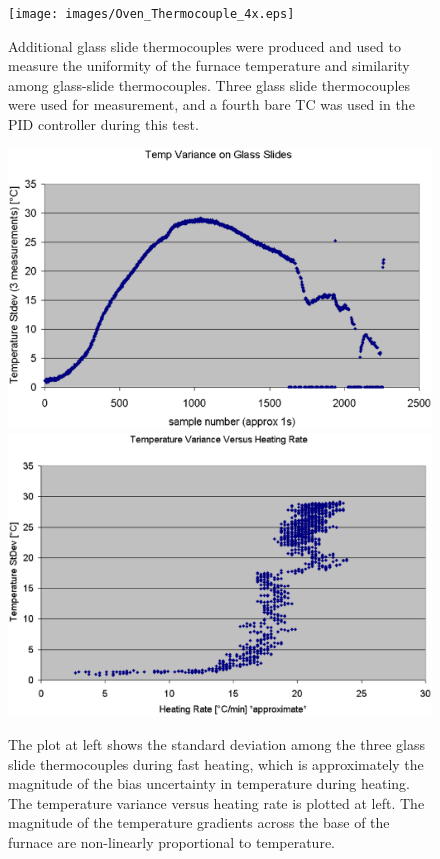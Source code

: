 	\begin{figure}
		\texttt{[image: images/Oven\_Thermocouple\_4x.eps]}
		\caption{Additional glass slide thermocouples were produced and used to measure the uniformity of the furnace temperature and similarity among glass-slide thermocouples.  Three glass slide thermocouples were used for measurement, and a fourth bare TC was used in the PID controller during this test.}
	\end{figure}
	\begin{figure}
		\includegraphics[width=140mm]{images/heating_data.eps}
		\includegraphics[width=140mm]{images/variance_vs_rate.eps}
		\caption{The plot at left shows the standard deviation among the three glass slide thermocouples during fast heating, which is approximately the magnitude of the bias uncertainty in temperature during heating.  The temperature variance versus heating rate is plotted at left.  The magnitude of the temperature gradients across the base of the furnace are non-linearly proportional to temperature.}
	\end{figure}
	
